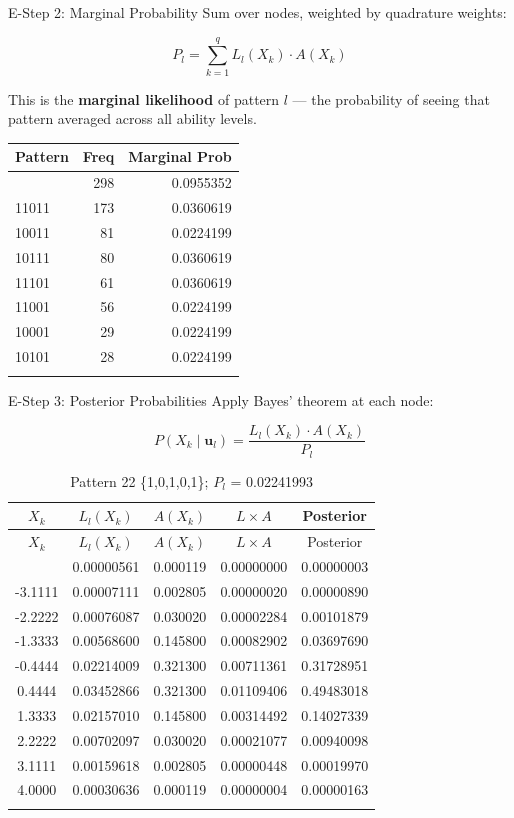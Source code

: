 \documentclass[
  ignorenonframetext,
]{beamer}
\begin{document}
\begin{frame}{E-Step 2: Marginal Probability}
\label{e-step-2-marginal-probability}
Sum over nodes, weighted by quadrature weights:

\[P_l = \sum_{k=1}^{q} L_l(X_k) \cdot A(X_k)\]

This is the \textbf{marginal likelihood} of pattern \(l\) --- the
probability of seeing that pattern averaged across all ability levels.

\begin{longtable}[]{@{}lrr@{}}
\toprule\noalign{}
Pattern & Freq & Marginal Prob \\
\midrule\noalign{}
\endhead
11111 & 298 & 0.0955352 \\
11011 & 173 & 0.0360619 \\
10011 & 81 & 0.0224199 \\
10111 & 80 & 0.0360619 \\
11101 & 61 & 0.0360619 \\
11001 & 56 & 0.0224199 \\
10001 & 29 & 0.0224199 \\
10101 & 28 & 0.0224199 \\
\bottomrule\noalign{}
\end{longtable}
\end{frame}

\begin{frame}{E-Step 3: Posterior Probabilities}
\label{e-step-3-posterior-probabilities}
Apply Bayes' theorem at each node:

\[P(X_k \mid \mathbf{u}_l) = \frac{L_l(X_k) \cdot A(X_k)}{P_l}\]

\begin{longtable}[]{@{}ccccc@{}}
\caption{Pattern 22 \{1,0,1,0,1\}; \(P_l\) = 0.02241993}\tabularnewline
\toprule\noalign{}
\(X_k\) & \(L_l(X_k)\) & \(A(X_k)\) & \(L \times A\) & Posterior \\
\midrule\noalign{}
\endfirsthead
\toprule\noalign{}
\(X_k\) & \(L_l(X_k)\) & \(A(X_k)\) & \(L \times A\) & Posterior \\
\midrule\noalign{}
\endhead
-4.0000 & 0.00000561 & 0.000119 & 0.00000000 & 0.00000003 \\
-3.1111 & 0.00007111 & 0.002805 & 0.00000020 & 0.00000890 \\
-2.2222 & 0.00076087 & 0.030020 & 0.00002284 & 0.00101879 \\
-1.3333 & 0.00568600 & 0.145800 & 0.00082902 & 0.03697690 \\
-0.4444 & 0.02214009 & 0.321300 & 0.00711361 & 0.31728951 \\
0.4444 & 0.03452866 & 0.321300 & 0.01109406 & 0.49483018 \\
1.3333 & 0.02157010 & 0.145800 & 0.00314492 & 0.14027339 \\
2.2222 & 0.00702097 & 0.030020 & 0.00021077 & 0.00940098 \\
3.1111 & 0.00159618 & 0.002805 & 0.00000448 & 0.00019970 \\
4.0000 & 0.00030636 & 0.000119 & 0.00000004 & 0.00000163 \\
\bottomrule\noalign{}
\end{longtable}
\end{frame}
\end{document}
